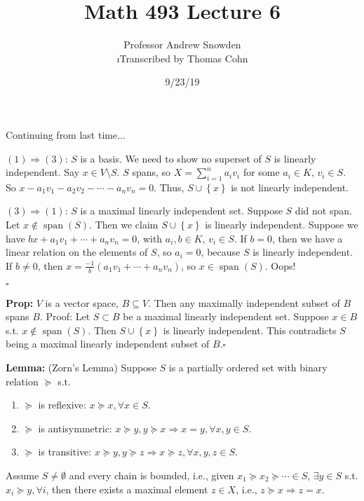 \documentclass[10pt,letterpaper]{article}
\author{Professor Andrew Snowden\\ \small\i{Transcribed by Thomas Cohn}}
\title{Math 493 Lecture 6}
\date{9/23/19} %
\newcommand{\n}{\hfill\break}
\newcommand{\hangblock}[2]{\par\noindent\settowidth{\hangindent}{\textbf{#1: }}\textbf{#1: }\!\!\!#2}
\newcommand{\lemma}[1]{\hangblock{Lemma}{#1}}
\newcommand{\prop}[1]{\hangblock{Prop}{#1}}
\newcommand{\proven}{\;$\square$\n}
\newcommand{\set}[1]{\left\{#1\right\}}
\newcommand{\cut}{\setminus}
\DeclareMathOperator{\vspan}{span}
\newcommand{\st}{s.t.}
\begin{document}
\maketitle
\setlength\RaggedRightParindent{\parindent}
\RaggedRight

\par\noindent
Continuing from last time...\n

\par\noindent
$(1)\Rightarrow(3)$: $S$ is a basis. We need to show no superset of $S$ is linearly independent. Say $x\in{}V\cut{}S$. $S$ spans, so $X=\sum_{i=1}^{n}a_{i}v_{i}$ for some $a_{i}\in{}K$, $v_{i}\in{}S$. So $x-a_{1}v_{1}-a_{2}v_{2}-\cdots-a_{n}v_{n}=0$. Thus, $S\cup\set{x}$ is not linearly independent.\n

\par\noindent
$(3)\Rightarrow(1)$: $S$ is a maximal linearly independent set. Suppose $S$ did not span. Let $x\not\in\vspan(S)$. Then we claim $S\cup\set{x}$ is linearly independent. Suppose we have $bx+a_{1}v_{1}+\cdots+a_{n}v_{n}=0$, with $a_{i},b\in{}K$, $v_{i}\in{}S$. If $b=0$, then we have a linear relation on the elements of $S$, so $a_{i}=0$, because $S$ is linearly independent. If $b\ne{}0$, then $x=\frac{-1}{b}(a_{1}v_{1}+\cdots+a_{n}v_{n})$, so $x\in\vspan(S)$. Oops!\n

\par\noindent
\proven

\prop{
	$V$ is a vector space, $B\subseteq{}V$. Then any maximally independent subset of $B$ spans $B$.\n
	Proof: Let $S\subset{}B$ be a maximal linearly independent set. Suppose $x\in{}B$ \st{} $x\not\in\vspan(S)$. Then $S\cup\set{x}$ is linearly independent. This contradicts $S$ being a maximal linearly independent subset of $B$.\proven
}

\lemma{
	(Zorn's Lemma) Suppose $S$ is a partially ordered set with binary relation $\succeq$ \st{}
	\begin{enumerate}
		\item $\succeq$ is reflexive: $x\succeq{}x,\forall{}x\in{}S$.
		\item $\succeq$ is antisymmetric: $x\succeq{}y,y\succeq{}x\Rightarrow{}x=y,\forall{}x,y\in{}S$.
		\item $\succeq$ is transitive: $x\succeq{}y,y\succeq{}z\Rightarrow{}x\succeq{}z,\forall{}x,y,z\in{}S$.
	\end{enumerate}
	Assume $S\ne\emptyset$ and every chain is bounded, i.e., given $x_{1}\succeq{}x_{2}\succeq\cdots\in{}S$, $\exists{}y\in{}S$ \st{} $x_{i}\succeq{}y,\forall{}i$, then there exists a maximal element $z\in{}X$, i.e., $z\succeq{}x\Rightarrow{}z=x$.\n
}
\end{document}
